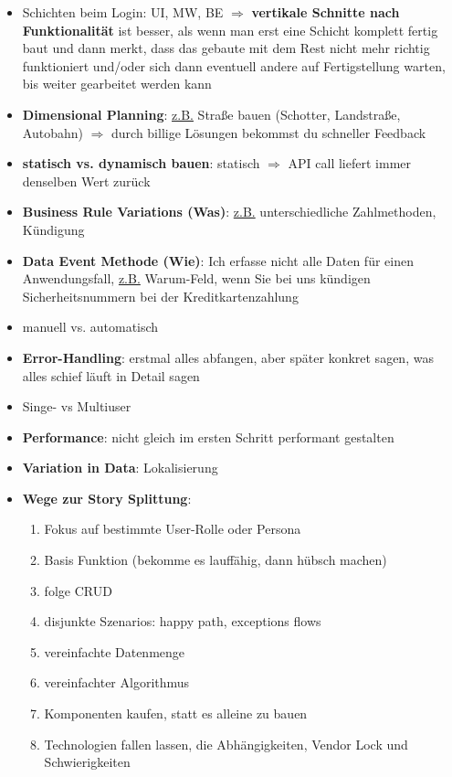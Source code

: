 

\begin{itemize}
  \item Schichten beim Login: UI, MW, BE $\Rightarrow$  \textbf{vertikale Schnitte nach
    Funktionalität} ist besser, als wenn man erst eine Schicht komplett fertig baut und dann
  merkt, dass das gebaute mit dem Rest nicht mehr richtig funktioniert und/oder sich dann
  eventuell andere auf Fertigstellung warten, bis weiter gearbeitet werden kann
  \item \textbf{Dimensional Planning}: \uline{z.B.} Straße bauen (Schotter, Landstraße,
    Autobahn) $\Rightarrow$  durch billige Lösungen bekommst du schneller Feedback
    \item \textbf{statisch vs. dynamisch bauen}: statisch $\Rightarrow$  API call liefert immer
    denselben Wert zurück
  \item \textbf{Business Rule Variations (Was)}: \uline{z.B.} unterschiedliche Zahlmethoden, Kündigung
  \item \textbf{Data Event Methode (Wie)}: Ich erfasse nicht alle Daten für einen
    Anwendungsfall, \uline{z.B.} Warum-Feld, wenn Sie bei uns kündigen \oder
    Sicherheitsnummern bei der Kreditkartenzahlung
  \item manuell vs. automatisch
  \item \textbf{Error-Handling}: erstmal alles abfangen, aber später konkret sagen, was alles
    schief läuft in Detail sagen
  \item Singe- vs Multiuser
  \item \textbf{Performance}: nicht gleich im ersten Schritt performant gestalten
  \item \textbf{Variation in Data}: Lokalisierung
  \item \textbf{Wege zur Story Splittung}:
  \begin{enumerate}
    \item Fokus auf bestimmte User-Rolle oder Persona
    \item Basis Funktion (bekomme es lauffähig, dann hübsch machen)
    \item folge CRUD
    \item disjunkte Szenarios: happy path, exceptions flows
    \item vereinfachte Datenmenge
    \item vereinfachter Algorithmus
    \item Komponenten kaufen, statt es alleine zu bauen
    \item Technologien fallen lassen, die Abhängigkeiten, Vendor Lock und Schwierigkeiten

\end{enumerate}
\end{itemize}
